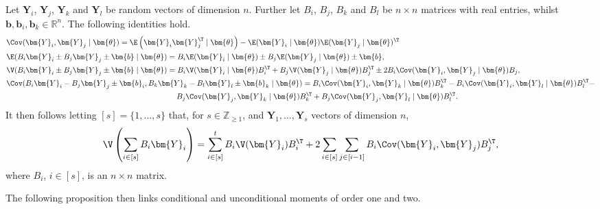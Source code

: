 \begin{proposition}
\label{prop:propmom}
Let $\bm{Y}_i$, $\bm{Y}_j$, $\bm{Y}_k$ and $\bm{Y}_l$ be random vectors of dimension $n$. Further let $B_i$, $B_j$, $B_k$ and $B_l$ be $n\times n$ matrices with real entries, whilst $\bm{b},\bm{b}_{i},\bm{b}_{k}\in\mathbb{R}^n$. The following identities hold. 
\begin{align}
&\Cov(\bm{Y}_i,\bm{Y}_j\;|\;\bm{\theta})=\E\left(\bm{Y}_i\bm{Y}_j^\T\;|\;\bm{\theta}\right)-\E(\bm{Y}_i\;|\;\bm{\theta})\E(\bm{Y}_j\;|\;\bm{\theta})^\T\nonumber\\
&\E(B_i\bm{Y}_i\pm B_j\bm{Y}_j\pm \bm{b}\;|\;\bm{\theta})=B_i\E(\bm{Y}_i\;|\;\bm{\theta})\pm B_j\E(\bm{Y}_j\;|\;\bm{\theta}) \pm \bm{b},\label{eq:linexp}\\
&\V(B_i\bm{Y}_i \pm B_j\bm{Y}_j\pm \bm{b}\;|\;\bm{\theta})=B_i\V(\bm{Y}_i\;|\;\bm{\theta})B_i^\T+B_j\V(\bm{Y}_j\;|\;\bm{\theta})B_j^\T\pm 2B_i\Cov(\bm{Y}_i,\bm{Y}_j\;|\;\bm{\theta})B_j,\nonumber\\
&\Cov(B_i\bm{Y}_i - B_j\bm{Y}_j\pm \bm{b}_{i},B_k\bm{Y}_k - B_l\bm{Y}_l \pm \bm{b}_{k}\;|\;\bm{\theta})=B_i\Cov(\bm{Y}_i,\bm{Y}_k\;|\;\bm{\theta})B_k^\T-B_i\Cov(\bm{Y}_i,\bm{Y}_l\;|\;\bm{\theta})B_l^\T
-\nonumber\\ 
&\hspace{7.8cm} B_j\Cov(\bm{Y}_j,\bm{Y}_k\;|\;\bm{\theta})B_k^\T+B_j\Cov(\bm{Y}_j,\bm{Y}_l\;|\;\bm{\theta})B_l^\T.\nonumber
\end{align}
It then follows letting $[s]=\{1,\dots,s\}$ that, for $s\in\mathbb{Z}_{\geq 1}$, and $\bm{Y}_1,\dots,\bm{Y}_s$ vectors of dimension $n$,
\begin{equation} 
\V\left(\sum_{i\in[s]}B_i\bm{Y}_i\right)=\sum_{i\in[s]}^tB_i\V(\bm{Y}_i)B_i^\T+2\sum_{i\in[s]}\sum_{j\in[i-1]}B_i\Cov(\bm{Y}_i,\bm{Y}_j)B_j^\T,\nonumber
\end{equation}
where $B_i$, $i\in[s]$, is an $n\times n$ matrix.
\end{proposition}

The following proposition then links conditional and unconditional moments of order one and two.

